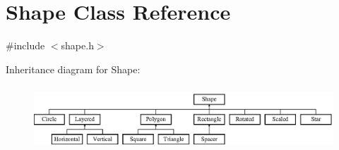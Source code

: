 \hypertarget{class_shape}{}\section{Shape Class Reference}
\label{class_shape}


{\ttfamily \#include $<$shape.\+h$>$}

Inheritance diagram for Shape\+:\begin{figure}[H]
\begin{center}
\leavevmode
\includegraphics[height=2.424242cm]{class_shape}
\end{center}
\end{figure}
